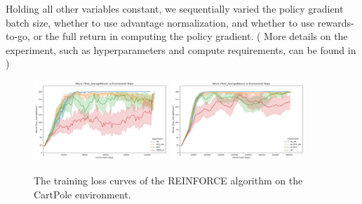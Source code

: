 \documentclass{article} %
\theoremstyle{definition}
\begin{document}
Holding all other variables constant, we sequentially varied the policy gradient batch size,
whether to use advantage normalization, and whether to use rewards-to-go,
or the full return in computing the policy gradient. (
    More details on the experiment, such as hyperparameters
    and compute requirements, can be found in \cite{wk3}
)

\begin{figure}
    \centering
    \includegraphics[width=0.45\textwidth, height=0.15\textheight]{images/return-vs-env-steps-small-batch.png}
    \includegraphics[width=0.45\textwidth, height=0.15\textheight]{images/return-vs-env-steps-large-batch.png}
    \caption{The training loss curves of the REINFORCE algorithm on the CartPole environment.}
    \label{fig:reinforce-cartpole}
\end{figure}
\end{document}
